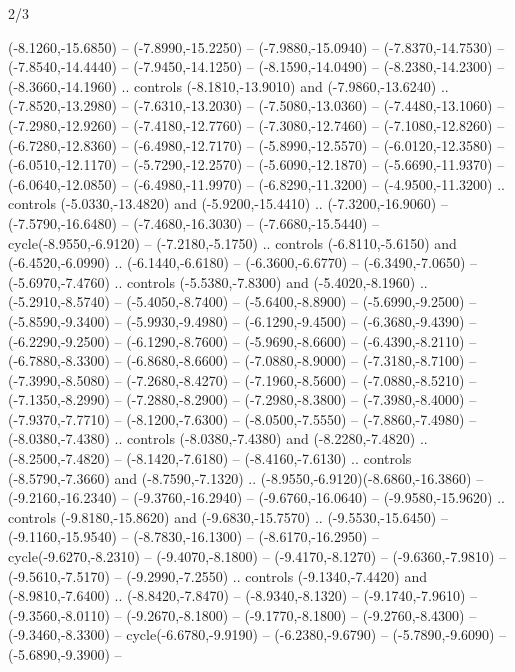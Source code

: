 \begin{flagdescription}{2/3}
\begin{scope}[xshift=0.5\flaglength,yshift=0.5\flagwidth,scale=\flagwidth/480]
\begin{scope}[y=0.80pt, x=0.80pt, yscale=-1,shift={(-450,-300)}]
  (-8.1260,-15.6850) -- (-7.8990,-15.2250) -- (-7.9880,-15.0940) --
  (-7.8370,-14.7530) -- (-7.8540,-14.4440) -- (-7.9450,-14.1250) --
  (-8.1590,-14.0490) -- (-8.2380,-14.2300) -- (-8.3660,-14.1960) .. controls
  (-8.1810,-13.9010) and (-7.9860,-13.6240) .. (-7.8520,-13.2980) --
  (-7.6310,-13.2030) -- (-7.5080,-13.0360) -- (-7.4480,-13.1060) --
  (-7.2980,-12.9260) -- (-7.4180,-12.7760) -- (-7.3080,-12.7460) --
  (-7.1080,-12.8260) -- (-6.7280,-12.8360) -- (-6.4980,-12.7170) --
  (-5.8990,-12.5570) -- (-6.0120,-12.3580) -- (-6.0510,-12.1170) --
  (-5.7290,-12.2570) -- (-5.6090,-12.1870) -- (-5.6690,-11.9370) --
  (-6.0640,-12.0850) -- (-6.4980,-11.9970) -- (-6.8290,-11.3200) --
  (-4.9500,-11.3200) .. controls (-5.0330,-13.4820) and (-5.9200,-15.4410) ..
  (-7.3200,-16.9060) -- (-7.5790,-16.6480) -- (-7.4680,-16.3030) --
  (-7.6680,-15.5440) -- cycle(-8.9550,-6.9120) -- (-7.2180,-5.1750) .. controls
  (-6.8110,-5.6150) and (-6.4520,-6.0990) .. (-6.1440,-6.6180) --
  (-6.3600,-6.6770) -- (-6.3490,-7.0650) -- (-5.6970,-7.4760) .. controls
  (-5.5380,-7.8300) and (-5.4020,-8.1960) .. (-5.2910,-8.5740) --
  (-5.4050,-8.7400) -- (-5.6400,-8.8900) -- (-5.6990,-9.2500) --
  (-5.8590,-9.3400) -- (-5.9930,-9.4980) -- (-6.1290,-9.4500) --
  (-6.3680,-9.4390) -- (-6.2290,-9.2500) -- (-6.1290,-8.7600) --
  (-5.9690,-8.6600) -- (-6.4390,-8.2110) -- (-6.7880,-8.3300) --
  (-6.8680,-8.6600) -- (-7.0880,-8.9000) -- (-7.3180,-8.7100) --
  (-7.3990,-8.5080) -- (-7.2680,-8.4270) -- (-7.1960,-8.5600) --
  (-7.0880,-8.5210) -- (-7.1350,-8.2990) -- (-7.2880,-8.2900) --
  (-7.2980,-8.3800) -- (-7.3980,-8.4000) -- (-7.9370,-7.7710) --
  (-8.1200,-7.6300) -- (-8.0500,-7.5550) -- (-7.8860,-7.4980) --
  (-8.0380,-7.4380) .. controls (-8.0380,-7.4380) and (-8.2280,-7.4820) ..
  (-8.2500,-7.4820) -- (-8.1420,-7.6180) -- (-8.4160,-7.6130) .. controls
  (-8.5790,-7.3660) and (-8.7590,-7.1320) .. (-8.9550,-6.9120)(-8.6860,-16.3860)
  -- (-9.2160,-16.2340) -- (-9.3760,-16.2940) -- (-9.6760,-16.0640) --
  (-9.9580,-15.9620) .. controls (-9.8180,-15.8620) and (-9.6830,-15.7570) ..
  (-9.5530,-15.6450) -- (-9.1160,-15.9540) -- (-8.7830,-16.1300) --
  (-8.6170,-16.2950) -- cycle(-9.6270,-8.2310) -- (-9.4070,-8.1800) --
  (-9.4170,-8.1270) -- (-9.6360,-7.9810) -- (-9.5610,-7.5170) --
  (-9.2990,-7.2550) .. controls (-9.1340,-7.4420) and (-8.9810,-7.6400) ..
  (-8.8420,-7.8470) -- (-8.9340,-8.1320) -- (-9.1740,-7.9610) --
  (-9.3560,-8.0110) -- (-9.2670,-8.1800) -- (-9.1770,-8.1800) --
  (-9.2760,-8.4300) -- (-9.3460,-8.3300) -- cycle(-6.6780,-9.9190) --
  (-6.2380,-9.6790) -- (-5.7890,-9.6090) -- (-5.6890,-9.3900) --

\end{scope}
\end{scope}
\end{flagdescription}
